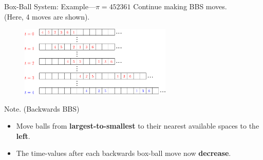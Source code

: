 \documentclass[aspectratio=169, serif]{beamer}
\begin{document}
    \begin{frame}{Box-Ball System: Example---$\pi=452361$}
        \phantom{---}Continue making BBS moves.\\
        (Here, 4 moves are shown).
        \begin{figure}
            \centering
            \includegraphics[width = 2.85in]{Step4V2.eps}
            \end{figure}
    \begin{block}{Note. (Backwards BBS)}
    \begin{itemize}
    \small
        \item Move balls from \textbf{largest-to-smallest} to their nearest available spaces to the \textbf{left}.
        \item The time-values after each backwards box-ball move now \textbf{decrease}. 
    \end{itemize}
    \end{block}
\end{frame}
\end{document}
